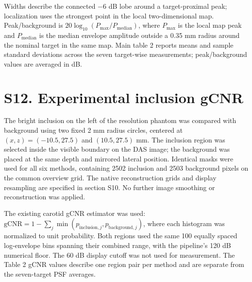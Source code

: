 \documentclass[10pt]{article}
\begin{document}
Widths describe the connected $-6$ dB lobe around a target-proximal peak;
localization uses the strongest point in the local two-dimensional map.
Peak/background is $20\log_{10}(P_{\max}/P_{\mathrm{median}})$, where
$P_{\max}$ is the local map peak and $P_{\mathrm{median}}$ is the median
envelope amplitude outside a 0.35 mm radius around the nominal target in the
same map. Main table 2 reports means and sample standard deviations across the
seven target-wise measurements; peak/background values are averaged in dB.

\begin{table}[h]
\centering
\caption{Individual experimental PICMUS response metrics for all seven point
targets and all six methods. The first column gives target number and nominal
position $(x,z)$; $y=0$ for every target. Widths are measured at $-6$ dB on
uncompressed envelopes.}
\label{tab:s11-psf}
\begingroup
\footnotesize
\setlength{\tabcolsep}{4pt}
\resizebox{\textwidth}{!}{}
\endgroup
\end{table}




\clearpage
\section*{S12. Experimental inclusion gCNR}

The bright inclusion on the left of the resolution phantom was compared with
background using two fixed 2 mm radius circles, centered at $(x,z)=(-10.5,27.5)$
and $(10.5,27.5)$ mm. The inclusion region was selected inside the visible
boundary on the DAS image; the background was placed at the same depth and
mirrored lateral position. Identical masks were used for all six methods,
containing 2502 inclusion and 2503 background pixels on the common overview
grid. The native reconstruction grids and display resampling are specified in
section S10. No further image smoothing or reconstruction was applied.

The existing carotid gCNR estimator was used: $\mathrm{gCNR}=1-\sum_j
\min(p_{\mathrm{inclusion},j},p_{\mathrm{background},j})$, where each histogram
was normalized to unit probability. Both regions used the same 100 equally
spaced log-envelope bins spanning their combined range, with the pipeline's
120 dB numerical floor. The 60 dB display cutoff was not used for measurement.
The Table 2 gCNR values describe one region pair per method and are separate
from the seven-target PSF averages.
\end{document}
